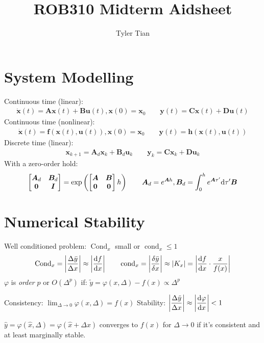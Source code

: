\documentclass[twocolumn, 8pt]{extarticle}
\title{ROB310 Midterm Aidsheet}
\author{Tyler Tian}
\begin{document}
\setlength{\abovedisplayskip}{3pt}
\setlength{\belowdisplayskip}{3pt}
\setlength{\parindent}{0pt}

\section{System Modelling} %

Continuous time (linear):
$$\begin{aligned} \dot{\bm x}(t) = \bm A\bm x(t) + \bm B\bm u(t), \bm x(0) = \bm x_0 \qquad \bm y(t) = \bm C\bm x(t) + \bm D\bm u(t)\end{aligned}$$
Continuous time (nonlinear):
$$\begin{aligned}\dot{\bm x}(t) = \bm f(\bm x(t), \bm u(t)), \bm x(0) = \bm x_0 \qquad \bm y(t) = \bm h(\bm x(t), \bm u(t))\end{aligned}$$
Discrete time (linear):
$$\begin{aligned}\bm x_{k + 1} = \bm A_d\bm x_k + \bm B_d\bm u_k \qquad \bm y_k = \bm C\bm x_k + \bm D\bm u_k\end{aligned}$$
With a zero-order hold:
\begin{gather*}\mattwo{\bm A_d}{\bm B_d}{\bm 0}{\bm I} = \exp\left(\mattwo{\bm A}{\bm B}{\bm 0}{\bm 0}h\right) \qquad \bm A_d = e^{\bm Ah}, \bm B_d = \int _0^h e^{\bm A\tau'}\dd\tau'\bm B\end{gather*}

\section{Numerical Stability} %

Well conditioned problem: $\operatorname{Cond}_x$ small or $\operatorname{cond}_x \leq 1$
\begin{gather*}
\operatorname{Cond}_x = \abs*{\frac{\Delta\bar y}{\Delta x}} \approx \abs*{\diff{f}{x}} \qquad \operatorname{cond}_x = \abs*{\frac{\delta\bar y}{\delta x}} \approx \abs{K_x} = \abs*{\diff{f}{x} \cdot \frac{x}{f(x)}}
\end{gather*}
$\varphi$ is \textit{order} $p$ or $O(\Delta^p)$ if: $\tilde y = \varphi(x, \Delta) - f(x) \propto \Delta^p$

Consistency: $\displaystyle\lim _{\Delta \to 0} \varphi(x, \Delta) = f(x)$ \qquad Stability: $\displaystyle\abs*{\frac{\Delta\tilde y}{\Delta x}} \approx \abs*{\diff{\varphi}{x}} < 1$

$\hat y = \varphi(\hat x, \Delta) = \varphi(\hat x + \Delta x)$ converges to $f(x)$ for $\Delta \to 0$ if it's consistent and at least marginally stable.
\end{document}
